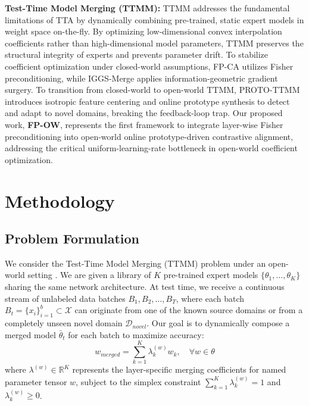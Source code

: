 \documentclass{article}
\theoremstyle{plain}
\theoremstyle{definition}
\theoremstyle{remark}
\begin{document}
\textbf{Test-Time Model Merging (TTMM):} 
TTMM addresses the fundamental limitations of TTA by dynamically combining pre-trained, static expert models in weight space on-the-fly. 
By optimizing low-dimensional convex interpolation coefficients rather than high-dimensional model parameters, TTMM preserves the structural integrity of experts and prevents parameter drift. 
To stabilize coefficient optimization under closed-world assumptions, FP-CA \cite{fp_ca} utilizes Fisher preconditioning, while IGGS-Merge \cite{iggs_merge} applies information-geometric gradient surgery. 
To transition from closed-world to open-world TTMM, PROTO-TTMM \cite{proto_ttmm} introduces isotropic feature centering and online prototype synthesis to detect and adapt to novel domains, breaking the feedback-loop trap. 
Our proposed work, \textbf{FP-OW}, represents the first framework to integrate layer-wise Fisher preconditioning into open-world online prototype-driven contrastive alignment, addressing the critical uniform-learning-rate bottleneck in open-world coefficient optimization.

\section{Methodology}
\label{methodology}

\subsection{Problem Formulation}
We consider the Test-Time Model Merging (TTMM) problem under an open-world setting \cite{proto_ttmm}. We are given a library of $K$ pre-trained expert models $\{\theta_1, \dots, \theta_K\}$ sharing the same network architecture. At test time, we receive a continuous stream of unlabeled data batches $B_1, B_2, \dots, B_T$, where each batch $B_t = \{x_i\}_{i=1}^b \subset \mathcal{X}$ can originate from one of the known source domains or from a completely unseen novel domain $\mathcal{D}_{novel}$. Our goal is to dynamically compose a merged model $\bar{\theta}_t$ for each batch to maximize accuracy:
\begin{equation}
  w_{merged} = \sum_{k=1}^K \lambda_k^{(w)} w_k, \quad \forall w \in \theta
\end{equation}
where $\lambda^{(w)} \in \mathbb{R}^K$ represents the layer-specific merging coefficients for named parameter tensor $w$, subject to the simplex constraint $\sum_{k=1}^K \lambda_k^{(w)} = 1$ and $\lambda_k^{(w)} \geq 0$.
\end{document}
